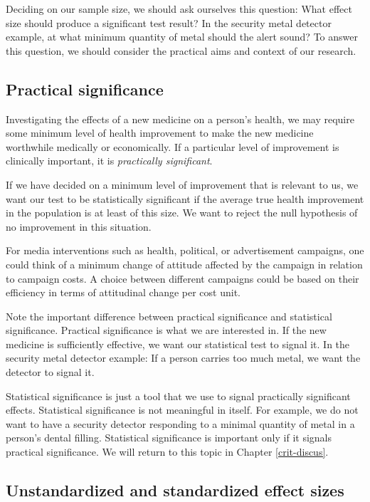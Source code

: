 \documentclass[a4paper]{book}
\theoremstyle{definition}
\theoremstyle{definition}
\theoremstyle{definition}
\theoremstyle{remark}
\begin{document}
Deciding on our sample size, we should ask ourselves this question: What
effect size should produce a significant test result? In the security
metal detector example, at what minimum quantity of metal should the
alert sound? To answer this question, we should consider the practical
aims and context of our research.

\subsection{Practical significance}\label{practical-significance}

Investigating the effects of a new medicine on a person's health, we may
require some minimum level of health improvement to make the new
medicine worthwhile medically or economically. If a particular level of
improvement is clinically important, it is \emph{practically
significant}.

If we have decided on a minimum level of improvement that is relevant to
us, we want our test to be statistically significant if the average true
health improvement in the population is at least of this size. We want
to reject the null hypothesis of no improvement in this situation.

For media interventions such as health, political, or advertisement
campaigns, one could think of a minimum change of attitude affected by
the campaign in relation to campaign costs. A choice between different
campaigns could be based on their efficiency in terms of attitudinal
change per cost unit.

Note the important difference between practical significance and
statistical significance. Practical significance is what we are
interested in. If the new medicine is sufficiently effective, we want
our statistical test to signal it. In the security metal detector
example: If a person carries too much metal, we want the detector to
signal it.

Statistical significance is just a tool that we use to signal
practically significant effects. Statistical significance is not
meaningful in itself. For example, we do not want to have a security
detector responding to a minimal quantity of metal in a person's dental
filling. Statistical significance is important only if it signals
practical significance. We will return to this topic in Chapter
\ref{crit-discus}.

\subsection{Unstandardized and standardized effect
sizes}\label{unstandardized-and-standardized-effect-sizes}
\end{document}
